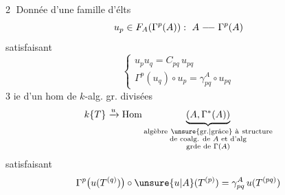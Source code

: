 \textcircled{2} Donnée d'une famille d'élts
\[
u_p\in F_A(\Gamma^p(A)):\ A\mathrel{\relbar\joinrel\relbar}\Gamma^p(A)
\]
satisfaisant
\[
\begin{cases}
u_pu_q=C_{pq}\,u_{pq}\\
\Gamma^p(u_q)\circ u_p=\gamma^A_{pq}\circ u_{pq}
\end{cases}
\]
3 ie d'un hom  de $k$-alg. gr. divisées
\[
k\{T\}\xrightarrow{u}
\operatorname{Hom}\underbrace{(A,\Gamma^*(A))}_{\substack{\text{algèbre}\ \text{\unsure{gr.|grâce} à}\ \text{structure}\\
\text{de coalg. de }A\text{ et d'alg}\\
\text{grde}\text{ de }\Gamma(A)}}
\]
satisfaisant
\[
\Gamma^p\bigl(u(T^{(q)})\bigr)\circ\unsure{u|A}(T^{(p)})
=\gamma^A_{pq}\,u(T^{(pq)})
\]

